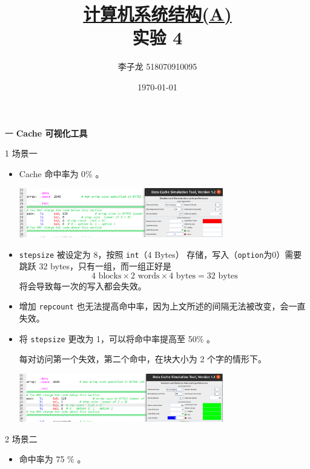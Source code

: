 \documentclass[12pt,a4paper]{article}
\newenvironment{problems}{\begin{list}{}{\renewcommand{\makelabel}[1]{\textbf{##1}.\hfil}}}{\end{list}}
\newenvironment{steps}{\begin{list}{}{\renewcommand{\makelabel}[1]{(##1)\hfil}}}{\end{list}}
\begin{document}
\title{\normalsize \underline{计算机系统结构(A)}\\\LARGE 实验 4}
\author{李子龙 518070910095}
\date{\today}
\maketitle

\begin{problems}
    \item[一] \textbf{Cache 可视化工具}
    
    \begin{steps}
        \item[1] 场景一
        
        \begin{itemize}
            \item Cache 命中率为 0\% 。
            
            \includegraphics[width=0.7\textwidth]{cache1.png}
            \item \verb"stepsize" 被设定为 8，按照 \verb"int"（4 Bytes） 存储，写入（\verb"option"为0）需要跳跃 32 bytes，只有一组，而一组正好是
            \begin{equation*}
                4\text{ blocks}\times 2\text{ words}\times 4\text{ bytes} = 32 \text{ bytes}
            \end{equation*}
            将会导致每一次的写入都会失效。
            \item 增加 \verb"repcount" 也无法提高命中率，因为上文所述的间隔无法被改变，会一直失效。
            \item 将 \verb"stepsize" 更改为 1，可以将命中率提高至 50\% 。
            
            每对访问第一个失效，第二个命中，在块大小为 2 个字的情形下。

            \includegraphics[width=0.7\textwidth]{cache1o.png}
        \end{itemize}

        \item[2] 场景二
        \begin{itemize}
            \item 命中率为 75 \% 。
            

\end{itemize}
\end{steps}
\end{problems}
\end{document}
